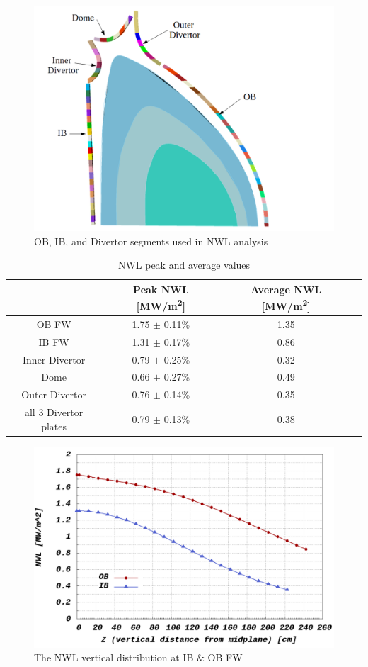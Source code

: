 \documentclass[12pt, letterpaper]{elsarticle}
\begin{document}
\begin{figure}[h!]
  \centering
  \includegraphics[scale=0.3]{../plots/NWL_segments.png}
  \caption{OB, IB, and Divertor segments used in NWL analysis}
  \label{fig:NWL segments}
\end{figure}
\begin{table}[h!]
	\caption{NWL peak and average values}
	\label{NWL peak and average values}
	\begin{tabular}{ |c|c|c|c| } 
		\hline
		 {} & Peak NWL [MW/m\textsuperscript{2}] & Average NWL [MW/m\textsuperscript{2}] \\
		\hline
		{OB FW} & 1.75 $\pm$ 0.11\% & 1.35 \\
		\hline
		{IB FW} & 1.31 $\pm$ 0.17\% & 0.86 \\
		\hline
		{Inner Divertor} & 0.79 $\pm$ 0.25\% & 0.32 \\
		\hline
		{Dome} & 0.66 $\pm$ 0.27\% & 0.49 \\
		\hline
		{Outer Divertor} & 0.76 $\pm$ 0.14\% & 0.35 \\
		\hline
		{all 3 Divertor plates} & 0.79 $\pm$ 0.13\% & 0.38 \\
		\hline
	\end{tabular}
\end{table}
 \begin{figure}[h!]
  \centering
  \includegraphics[scale=0.2]{../plots/NWL_FWs.png}
  \caption{The NWL vertical distribution at IB $\&$ OB FW}
  \label{fig:NWL FWs}
\end{figure}
\end{document}
